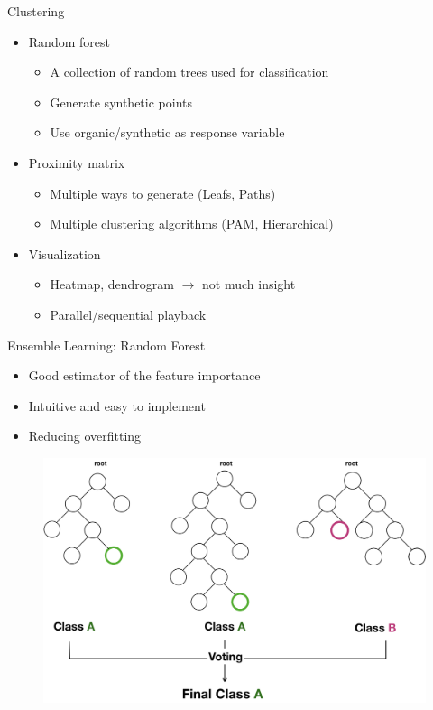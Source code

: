 \documentclass[shortpres]{beamer}
\begin{document}
\begin{frame}{Clustering}	

\begin{itemize} 
\item Random forest
\begin{itemize}
\item A collection of random trees used for classification
\item Generate synthetic points
\item Use organic/synthetic as response variable
\end{itemize}
\item Proximity matrix
\begin{itemize}
\item Multiple ways to generate (Leafs, Paths)
\item Multiple clustering algorithms (PAM, Hierarchical)
\end{itemize}
\item Visualization
\begin{itemize}
\item Heatmap, dendrogram $\rightarrow$ not much insight
\item Parallel/sequential playback
\end{itemize}
\end{itemize}
\end{frame}
\begin{frame}{Ensemble Learning: Random Forest}	
  \begin{itemize} 
    \item Good estimator of the feature importance 
    \item Intuitive and easy to implement
    \item Reducing overfitting
  \end{itemize}
  \begin{figure}
    \includegraphics[height=0.6\textheight]{fig/forest0.png}
  \end{figure}
\end{frame}
\end{document}
